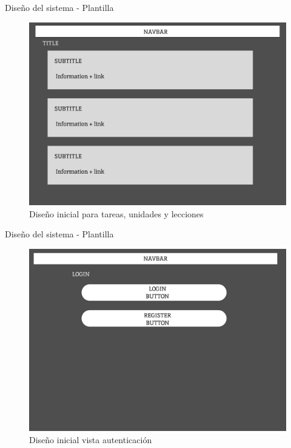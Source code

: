 \documentclass{beamer}
\begin{document}
    \begin{frame}{Diseño del sistema - Plantilla}

        \begin{figure}
            \centering
            \includegraphics[width=.8\textwidth]{Presentacion/mockup/other.png}
            \caption{Diseño inicial para tareas, unidades y lecciones}
        \end{figure}
        
    \end{frame}  

    \begin{frame}{Diseño del sistema - Plantilla}

        \begin{figure}
            \centering
            \includegraphics[width=.8\textwidth]{Presentacion/mockup/general login.png}
            \caption{Diseño inicial vista autenticación}
        \end{figure}
        
    \end{frame}  
\end{document}
